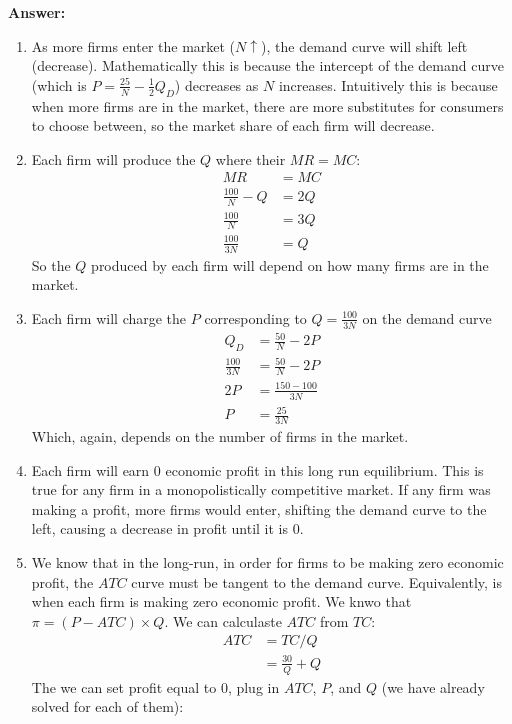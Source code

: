 \documentclass[12pt]{article}
\begin{document}
\vspace{4mm}
\textbf{Answer:}
\begin{enumerate}[label = (\alph*)]
    \item As more firms enter the market ($N \uparrow$), the demand curve will shift left (decrease). Mathematically this is because the intercept of the demand curve (which is $P = \frac{25}{N} - \frac{1}{2}Q_D$) decreases as $N$ increases. Intuitively this is because when more firms are in the market, there are more substitutes for consumers to choose between, so the market share of each firm will decrease.
    \item Each firm will produce the $Q$ where their $MR = MC$:
    \begin{align*}
        MR &= MC \\
        \frac{100}{N} - Q &= 2Q \\
        \frac{100}{N} &= 3Q \\
        \frac{100}{3N} &= Q
    \end{align*}
    So the $Q$ produced by each firm will depend on how many firms are in the market.
    \item Each firm will charge the $P$ corresponding to $Q = \frac{100}{3N}$ on the demand curve
    \begin{align*}
        Q_D &= \frac{50}{N} - 2P \\
        \frac{100}{3N} &= \frac{50}{N} - 2P \\
        2P &= \frac{150 - 100}{3N} \\
        P &= \frac{25}{3N}
    \end{align*}
    Which, again, depends on the number of firms in the market.
    \item Each firm will earn $0$ economic profit in this long run equilibrium. This is true for any firm in a monopolistically competitive market. If any firm was making a profit, more firms would enter, shifting the demand curve to the left, causing a decrease in profit until it is $0$. 
    \item We know that in the long-run, in order for firms to be making zero economic profit, the $ATC$ curve must be tangent to the demand curve. Equivalently, is when each firm is making zero economic profit. We knwo that $\pi = (P - ATC)\times Q$. We can calculaste $ATC$ from $TC$:
    \begin{align*}
        ATC &= TC/Q \\
        &= \frac{30}{Q} + Q
    \end{align*}
    The we can set profit equal to 0, plug in $ATC$, $P$, and $Q$ (we have already solved for each of them):

\end{enumerate}
\end{document}
